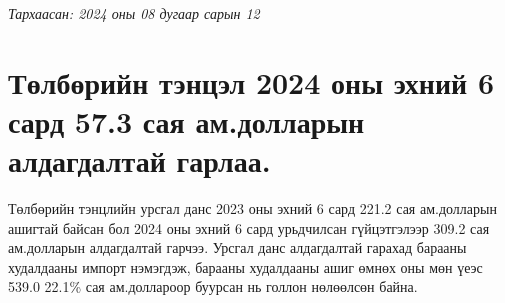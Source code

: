 ﻿
\begin{flushright}
    \textit{Тархаасан: 2024 оны 08 дугаар сарын 12} %
\end{flushright}


\section*{Төлбөрийн тэнцэл 2024 оны эхний 6 сард 57.3 сая
ам.долларын алдагдалтай гарлаа.}

Төлбөрийн тэнцлийн урсгал данс 2023 оны эхний 6 сард 221.2 сая
ам.долларын ашигтай байсан бол 2024 оны эхний 6 сард урьдчилсан
гүйцэтгэлээр 309.2 сая ам.долларын алдагдалтай гарчээ. Урсгал данс алдагдалтай гарахад
барааны худалдааны импорт нэмэгдэж, барааны худалдааны ашиг өмнөх оны мөн үеэс 539.0
22.1\% сая ам.доллароор буурсан нь голлон нөлөөлсөн байна.